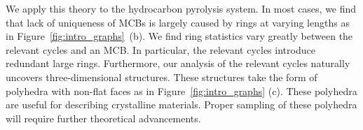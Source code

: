 \documentclass[fleqn,11pt]{article}
\begin{document}
We apply this theory to the hydrocarbon pyrolysis system. In most cases, we find that lack of uniqueness of MCBs is largely caused by rings at varying lengths as in Figure~\ref{fig:intro_graphs}~(b). We find ring statistics vary greatly between the relevant cycles and an MCB. In particular, the relevant cycles introduce redundant large rings. 
Furthermore, our analysis of the relevant cycles naturally uncovers three-dimensional structures. 
These structures take the form of polyhedra with non-flat faces as in Figure~\ref{fig:intro_graphs} (c). 
These polyhedra are useful for describing crystalline materials. 
Proper sampling of these polyhedra will require further theoretical advancements.


\end{document}
